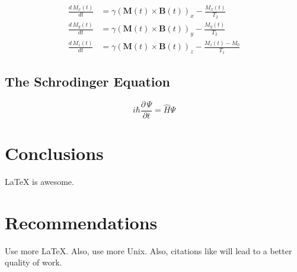 \documentclass{workreport}
\begin{document}
\begin{body}
	\begin{align}
		\frac{d\, M_x(t)}{dt} &= \gamma(\mathbf{M}(t) \times \mathbf{B}(t))_x - \frac{M_x(t)}{T_2} \\
		\frac{d\, M_y(t)}{dt} &= \gamma(\mathbf{M}(t) \times \mathbf{B}(t))_y - \frac{M_y(t)}{T_2} \\
		\frac{d\, M_z(t)}{dt} &= \gamma(\mathbf{M}(t) \times \mathbf{B}(t))_z - \frac{M_z(t) - M_0}{T_1}
	\end{align}

\subsection{The Schrodinger Equation}

	\begin{equation}
		i\hbar \frac{\partial \, \Psi}{\partial t} = \hat{H}\Psi
	\end{equation}

\section{Conclusions}
	\gls{LaTeX} is awesome.

\section{Recommendations}

	Use more \LaTeX. Also, use more \gls{Unix}. Also, citations like
    \cite{schweiger_principles_2001} will lead to a better quality of work.

\end{body}

\begin{backmatter}

		\lipsum[1-2]
        
		\lipsum[1-2]

\end{backmatter}
\end{document}
